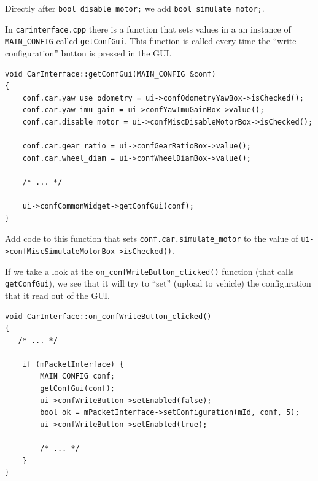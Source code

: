 \documentclass[12pt]{article} %
\newcommand{\change}[0]{\noindent{\hl {\b CODE CHANGE:}}}
\begin{document}
\change{} Directly after {\verb!bool disable_motor;!} we add {\verb!bool simulate_motor;!}.






In {\verb!carinterface.cpp!} there is a function that sets values in a
an instance of {\verb!MAIN_CONFIG!} called {\verb!getConfGui!}.  This
function is called every time the ``write configuration'' button is
pressed in the GUI. 

\begin{Verbatim}[samepage=true,frame=single,label=Linux/RControlStation/carinterface.cpp]
void CarInterface::getConfGui(MAIN_CONFIG &conf)
{
    conf.car.yaw_use_odometry = ui->confOdometryYawBox->isChecked();
    conf.car.yaw_imu_gain = ui->confYawImuGainBox->value();
    conf.car.disable_motor = ui->confMiscDisableMotorBox->isChecked();

    conf.car.gear_ratio = ui->confGearRatioBox->value();
    conf.car.wheel_diam = ui->confWheelDiamBox->value();
    
    /* ... */
    
    ui->confCommonWidget->getConfGui(conf);
}
\end{Verbatim}

\change{} Add code to this function that sets
       {\verb!conf.car.simulate_motor!} to the value of
       {\verb!ui->confMiscSimulateMotorBox->isChecked()!}.


If we take a look at the {\verb!on_confWriteButton_clicked()!}
function (that calls {\verb!getConfGui!}), we see that it will try
to ``set'' (upload to vehicle) the configuration that it read out of
the GUI.

\begin{Verbatim}[samepage=true,frame=single,label=Linux/RControlStation/carinterface.cpp]
void CarInterface::on_confWriteButton_clicked()
{
   /* ... */ 

    if (mPacketInterface) {
        MAIN_CONFIG conf;
        getConfGui(conf);
        ui->confWriteButton->setEnabled(false);
        bool ok = mPacketInterface->setConfiguration(mId, conf, 5);
        ui->confWriteButton->setEnabled(true);

        /* ... */ 
    }
}
\end{Verbatim}
\end{document}
